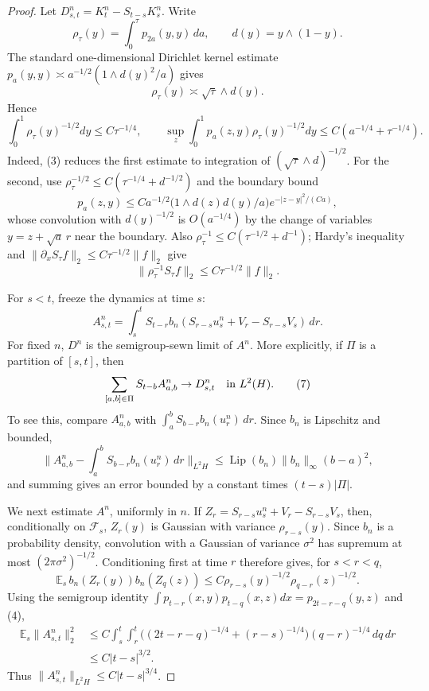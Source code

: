 \documentclass[12pt]{article}
\newcommand{\E}{\mathbb E}
\newcommand{\1}{\mathbf 1}
\newcommand{\calF}{\mathcal F}
\begin{document}
\begin{proof}
Let \(D^n_{s,t}=K_t^n-S_{t-s}K_s^n\).  Write
\[
        \rho_\tau(y)=\int_0^\tau p_{2a}(y,y)\,da,\qquad
        d(y)=y\wedge(1-y).
\]
The standard one-dimensional Dirichlet kernel estimate
\(p_a(y,y)\asymp a^{-1/2}(1\wedge d(y)^2/a)\) gives
\[
        \rho_\tau(y)\asymp \sqrt{\tau}\wedge d(y).             \tag{3}
\]
Hence
\[
 \int_0^1\rho_\tau(y)^{-1/2}dy\le C\tau^{-1/4},\qquad
 \sup_z\int_0^1p_a(z,y)\rho_\tau(y)^{-1/2}dy
     \le C(a^{-1/4}+\tau^{-1/4}).                            \tag{4}
\]
Indeed, (3) reduces the first estimate to integration of
\((\sqrt{\tau}\wedge d)^{-1/2}\).  For the second, use
\(\rho_\tau^{-1/2}\le C(\tau^{-1/4}+d^{-1/2})\) and the boundary bound
\[
p_a(z,y)\le C a^{-1/2}\bigl(1\wedge d(z)d(y)/a\bigr)
              e^{-|z-y|^2/(Ca)},
\]
whose convolution with \(d(y)^{-1/2}\) is \(O(a^{-1/4})\) by the change of
variables \(y=z+\sqrt a\,r\) near the boundary.  Also
\(\rho_\tau^{-1}\le C(\tau^{-1/2}+d^{-1})\); Hardy's inequality and
\(\|\partial_xS_\tau f\|_2\le C\tau^{-1/2}\|f\|_2\) give
\[
        \|\rho_\tau^{-1}S_\tau f\|_2\le C\tau^{-1/2}\|f\|_2 .
        \tag{5}
\]

For \(s<t\), freeze the dynamics at time \(s\):
\[
 A^n_{s,t}=\int_s^tS_{t-r}
 b_n\!\left(S_{r-s}u_s^n+V_r-S_{r-s}V_s\right)\,dr .          \tag{6}
\]
For fixed \(n\), \(D^n\) is the semigroup-sewn limit of \(A^n\).  More
explicitly, if \(\Pi\) is a partition of \([s,t]\), then
\[
 \sum_{[a,b]\in\Pi}S_{t-b}A^n_{a,b}\to D^n_{s,t}\quad\hbox{in }L^2(H).
 \tag{7}
\]
To see this, compare \(A^n_{a,b}\) with
\(\int_a^bS_{b-r}b_n(u_r^n)\,dr\).  Since \(b_n\) is Lipschitz and bounded,
\[
 \Big\|A^n_{a,b}-\int_a^bS_{b-r}b_n(u_r^n)\,dr\Big\|_{L^2H}
 \le \operatorname{Lip}(b_n)\|b_n\|_\infty (b-a)^2,
\]
and summing gives an error bounded by a constant times
\((t-s)|\Pi|\).

We next estimate \(A^n\), uniformly in \(n\).  If
\(Z_r=S_{r-s}u_s^n+V_r-S_{r-s}V_s\), then, conditionally on \(\calF_s\),
\(Z_r(y)\) is Gaussian with variance \(\rho_{r-s}(y)\).  Since \(b_n\) is a
probability density, convolution with a Gaussian of variance \(\sigma^2\) has
supremum at most \((2\pi\sigma^2)^{-1/2}\).  Conditioning first at time \(r\)
therefore gives, for \(s<r<q\),
\[
 \E_s\,b_n(Z_r(y))b_n(Z_q(z))
 \le C\rho_{r-s}(y)^{-1/2}\rho_{q-r}(z)^{-1/2}.              \tag{8}
\]
Using the semigroup identity
\(\int p_{t-r}(x,y)p_{t-q}(x,z)dx=p_{2t-r-q}(y,z)\) and (4),
\[
\begin{aligned}
 \E_s\|A^n_{s,t}\|_2^2
 &\le C\!\int_s^t\!\!\int_r^t
      \bigl((2t-r-q)^{-1/4}+(r-s)^{-1/4}\bigr)(q-r)^{-1/4}\,dq\,dr  \\
 &\le C|t-s|^{3/2}.
\end{aligned}                                                \tag{9}
\]
Thus \(\|A^n_{s,t}\|_{L^2H}\le C|t-s|^{3/4}\).


\end{proof}
\end{document}
